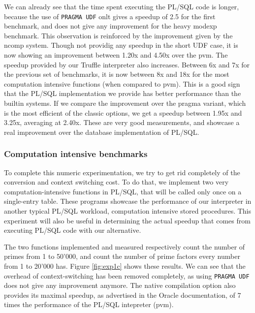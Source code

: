 \documentclass[twoside,11pt,a4paper]{article}
\newcommand{\pls}[1]{\small\texttt{#1}\normalsize}
\newcommand{\plstype}[1]{\pls{#1}}
\newcommand{\simpleint}{\plstype{SIMPLE\_INTEGER}}
\newcommand{\benchsystem}[1]{\textsf{#1}}
\newcommand{\pvm}{\benchsystem{pvm}}
\newcommand{\ncomp}{\benchsystem{ncomp}}
\newcommand{\ncpg}{\benchsystem{pragma}}
\newcommand{\bench}[1]{\textsf{#1}}
\begin{document}
We can already see that the time spent executing the PL/SQL code is longer, because the use of \pls{PRAGMA UDF} onlt gives a speedup of 2.5 for the first benchmark, and does not give any improvement for the heavy \bench{modexp} benchmark. This observation is reinforced by the improvement given by the \ncomp{} system. Though not providig any speedup in the short UDF case, it is now showing an improvement between 1.20x and 4.50x  over the \pvm{}. The speedup provided by our Truffle interpreter also increases. Between 6x and 7x for the previous set of benchmarks, it is now between 8x and 18x for the most computation intensive functions (when compared to \pvm{}). This is a good sign that the PL/SQL implementation we provide has better performance than the builtin systems. If we compare the improvement over the \ncpg{} variant, which is the most efficient of the classic options, we get a speedup between 1.95x and 3.25x, averaging at 2.40x. These are very good measurements, and showcase a real improvement over the database implementation of PL/SQL.

\subsubsection{Computation intensive benchmarks}

To complete this numeric experimentation, we try to get rid completely of the conversion and context switching cost. To do that, we implement two very computation-intensive functions in PL/SQL, that will be called only once on a single-entry table. These programs showcase the performance of our interpreter in another typical PL/SQL workload, computation intensive stored procedures. This experiment will also be useful in determining the actual speedup that comes from executing PL/SQL code with our alternative.



The two functions implemented and measured respectively count the number of primes from 1 to 50'000, and count the number of prime factors every number from 1 to 20'000 has. Figure \ref{fig:exp1c} shows these results. We can see that the overhead of context-switching has been removed completely, as using \pls{PRAGMA UDF} does not give any improvement anymore. The native compilation option also provides its maximal speedup, as advertised in the Oracle documentation, of 7 times the performance of the PL/SQL intepreter (\pvm{}).
\end{document}
